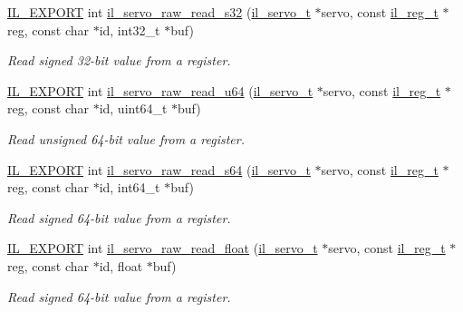 \begin{DoxyCompactItemize}
\hyperlink{common_8h_a6bb629d26c52bfe10519ba3176853f47}{I\+L\+\_\+\+E\+X\+P\+O\+RT} int \hyperlink{group__IL__SERVO_gab0c5bbb4fcd2784f10fab3648dc405c4}{il\+\_\+servo\+\_\+raw\+\_\+read\+\_\+s32} (\hyperlink{group__IL__SERVO_ga3369ddfcc33492fe3a28f96cf455b13e}{il\+\_\+servo\+\_\+t} $\ast$servo, const \hyperlink{structil__reg__t}{il\+\_\+reg\+\_\+t} $\ast$reg, const char $\ast$id, int32\+\_\+t $\ast$buf)
\begin{DoxyCompactList}\small\item\em Read signed 32-\/bit value from a register. \end{DoxyCompactList}\item 
\hyperlink{common_8h_a6bb629d26c52bfe10519ba3176853f47}{I\+L\+\_\+\+E\+X\+P\+O\+RT} int \hyperlink{group__IL__SERVO_ga254f9ed1043d3cc6e7175b0bb6a0c2c9}{il\+\_\+servo\+\_\+raw\+\_\+read\+\_\+u64} (\hyperlink{group__IL__SERVO_ga3369ddfcc33492fe3a28f96cf455b13e}{il\+\_\+servo\+\_\+t} $\ast$servo, const \hyperlink{structil__reg__t}{il\+\_\+reg\+\_\+t} $\ast$reg, const char $\ast$id, uint64\+\_\+t $\ast$buf)
\begin{DoxyCompactList}\small\item\em Read unsigned 64-\/bit value from a register. \end{DoxyCompactList}\item 
\hyperlink{common_8h_a6bb629d26c52bfe10519ba3176853f47}{I\+L\+\_\+\+E\+X\+P\+O\+RT} int \hyperlink{group__IL__SERVO_ga5caadeb6cb861b7a8b91dbb98113988f}{il\+\_\+servo\+\_\+raw\+\_\+read\+\_\+s64} (\hyperlink{group__IL__SERVO_ga3369ddfcc33492fe3a28f96cf455b13e}{il\+\_\+servo\+\_\+t} $\ast$servo, const \hyperlink{structil__reg__t}{il\+\_\+reg\+\_\+t} $\ast$reg, const char $\ast$id, int64\+\_\+t $\ast$buf)
\begin{DoxyCompactList}\small\item\em Read signed 64-\/bit value from a register. \end{DoxyCompactList}\item 
\hyperlink{common_8h_a6bb629d26c52bfe10519ba3176853f47}{I\+L\+\_\+\+E\+X\+P\+O\+RT} int \hyperlink{group__IL__SERVO_gacf0d6571be514e23c09581834203d90e}{il\+\_\+servo\+\_\+raw\+\_\+read\+\_\+float} (\hyperlink{group__IL__SERVO_ga3369ddfcc33492fe3a28f96cf455b13e}{il\+\_\+servo\+\_\+t} $\ast$servo, const \hyperlink{structil__reg__t}{il\+\_\+reg\+\_\+t} $\ast$reg, const char $\ast$id, float $\ast$buf)
\begin{DoxyCompactList}\small\item\em Read signed 64-\/bit value from a register. \end{DoxyCompactList}\item 

\end{DoxyCompactItemize}
